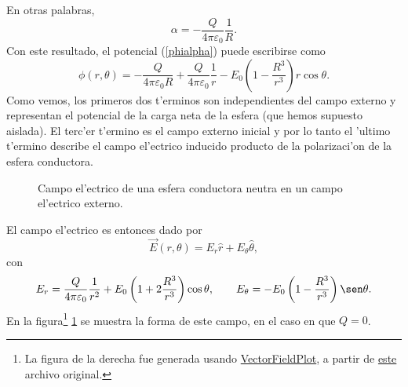 En otras palabras, 
\begin{equation}
\alpha=-\frac{Q}{4\pi \varepsilon_0}\frac{1}{R}.
\end{equation}
Con este resultado, el potencial (\ref{phialpha}) puede escribirse como 
\begin{equation}
\phi(r,\theta)=-\frac{Q}{4\pi\varepsilon_0 R}+\frac{Q}{4\pi\varepsilon_0}\frac{1}{r} -E_0 \left(1-\frac{R^3}{r^3}\right)r\cos\theta.
\end{equation}
Como vemos, los primeros dos t'erminos son independientes del campo externo y representan el potencial de la carga neta de la esfera (que hemos supuesto aislada). El terc'er t'ermino es el campo externo inicial y por lo tanto el 'ultimo t'ermino describe el campo el'ectrico inducido producto de la polarizaci'on de la esfera conductora.
\begin{figure}[!h]
\centerline{
\hspace{1cm}}
\caption{Campo el'ectrico de una esfera conductora neutra en un campo el'ectrico externo.}
\label{fig:ecce}
\end{figure}
El campo el'ectrico es entonces dado por
\begin{equation}
\vec{E}(r,\theta)=E_r\hat{r}+E_\theta\hat{\theta},
\end{equation}
con 
\begin{equation}
E_r=\frac{Q}{4\pi\varepsilon_0}\frac{1}{r^2}+E_0 \left(1+2\frac{R^3}{r^3}\right)\cos\theta, \qquad E_\theta=-E_0 \left(1-\frac{R^3}{r^3}\right)\sen\theta .
\end{equation}
En la figura\footnote{La figura de la derecha fue generada usando \href{http://commons.wikimedia.org/wiki/User:Geek3/VectorFieldPlot}{VectorFieldPlot}, a partir de \href{http://commons.wikimedia.org/wiki/File:VFPt_superconductor_ball_E-field.svg}{este} archivo original.} \ref{fig:ecce} se muestra la forma de este campo, en el caso en que $Q=0$.




